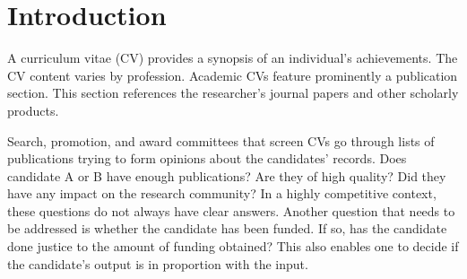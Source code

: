   \chapter{Introduction}\label{chap:Intro}
A curriculum vitae (CV) provides a synopsis of an individual's achievements. The CV content varies by profession. Academic CVs feature prominently a publication section. This section references the researcher's journal papers and other scholarly products.

Search, promotion, and award committees that screen CVs go through lists of publications trying to form opinions about the candidates' records. Does candidate A or B have enough publications? Are they of high quality? Did they have any impact on the research community?
In a highly competitive context, these questions do not always have clear answers. Another question that needs to be addressed is whether the candidate has been funded. If so, has the candidate done justice to the amount of funding obtained? This also enables one to decide if the candidate's output is in proportion with the input.